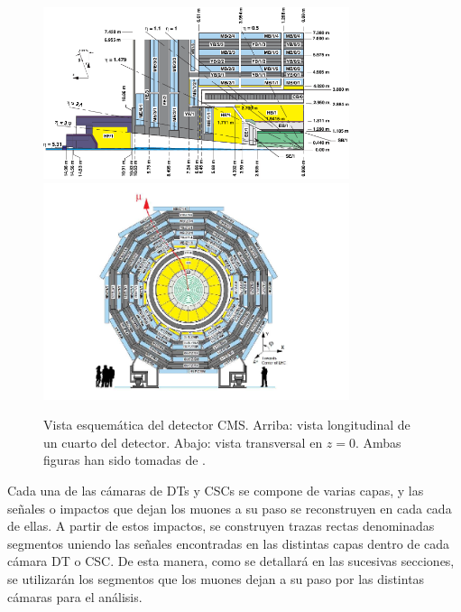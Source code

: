 \begin{figure}
\centering
\includegraphics[width=0.8\textwidth]{figures/CMSview1.png}
\includegraphics[width=0.8\textwidth]{figures/CMSview.png}
\caption{Vista esquem\'atica del detector CMS. Arriba: vista longitudinal de un cuarto del detector. Abajo: vista transversal en $z = 0$. Ambas figuras han sido tomadas de \cite{DTperformance}.}
\label{fig:CMSsub}
\end{figure}


Cada una de las c\'amaras de DTs y CSCs se compone de varias capas, y las se\~nales o impactos que dejan los muones a su paso se reconstruyen en cada cada de ellas. A partir de estos impactos, se construyen trazas rectas denominadas segmentos uniendo las se\~nales encontradas en las distintas capas dentro de cada c\'amara DT o CSC. De esta manera, como se detallar\'a en las sucesivas secciones, se utilizar\'an los segmentos que los muones dejan a su paso por las distintas c\'amaras para el an\'alisis.
